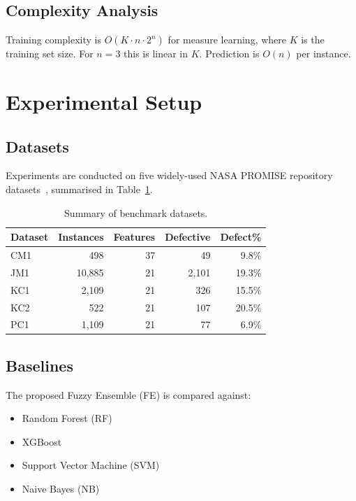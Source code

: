 \documentclass[10pt,twocolumn]{article}
\begin{document}
\subsection{Complexity Analysis}

Training complexity is $O(K \cdot n \cdot 2^n)$ for measure learning, where $K$ is the
training set size. For $n=3$ this is linear in $K$. Prediction is $O(n)$ per instance.

\section{Experimental Setup}
\label{sec:exp}

\subsection{Datasets}

Experiments are conducted on five widely-used NASA PROMISE repository
datasets~\cite{menzies2012promise}, summarised in Table~\ref{tab:datasets}.

\begin{table}[H]
  \centering
  \caption{Summary of benchmark datasets.}
  \label{tab:datasets}
  \small
  \begin{tabular}{lrrrr}
    \toprule
    \textbf{Dataset} & \textbf{Instances} & \textbf{Features} & \textbf{Defective} & \textbf{Defect\%} \\
    \midrule
    CM1  &   498 & 37 &  49 & 9.8\% \\
    JM1  & 10,885 & 21 & 2,101 & 19.3\% \\
    KC1  & 2,109 & 21 &  326 & 15.5\% \\
    KC2  &   522 & 21 &  107 & 20.5\% \\
    PC1  & 1,109 & 21 &  77 & 6.9\% \\
    \bottomrule
  \end{tabular}
\end{table}

\subsection{Baselines}

The proposed Fuzzy Ensemble (FE) is compared against:
\begin{itemize}
  \item Random Forest (RF)~\cite{breiman2001random}
  \item XGBoost~\cite{chen2016xgboost}
  \item Support Vector Machine (SVM)
  \item Naive Bayes (NB)
\end{itemize}
\end{document}

